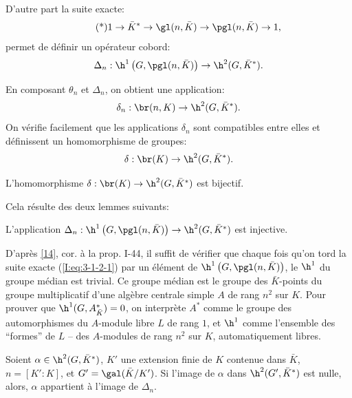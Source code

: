 D'autre part la suite exacte:
\begin{equation*}\tag{*}\label{I:eq:3-1-2-1}
  1 \to \bar K^* \to \gl(n,\bar K) \to \pgl(n,\bar K) \to 1\text{,}
\end{equation*}
permet de définir un opérateur cobord:
\[
  \Delta_n : \h^1\left(G,\pgl(n,\bar K)\right) \to \h^2(G,\bar K^*)\text{.}
\]

En composant $\theta_n$ et $\Delta_n$, on obtient une application:
\[
  \delta_n : \br(n,K) \to \h^2(G,\bar K^*)\text{.}
\]
On vérifie facilement que les applications $\delta_n$ sont compatibles entre 
elles et définissent un homomorphisme de groupes:
\[
  \delta : \br(K) \to \h^2(G,\bar K^*)\text{.}
\]





\begin{propositiondotdash}\label{I:3-1-3}
L'homomorphisme $\delta:\br(K)\to \h^2(G,\bar K^*)$ est bijectif. 
\end{propositiondotdash}

Cela résulte des deux lemmes suivants:





\begin{lemmadotdash}\label{I:3-1-4}
L'application 
$\Delta_n:\h^1\left(G,\pgl(n,\bar K)\right)\to \h^2(G,\bar K^*)$ est 
injective.
\end{lemmadotdash}

D'après \hyperlink{cite.se94}{[14]}, cor. à la prop. I-44, il suffit de vérifier que chaque 
fois qu'on tord la suite exacte (\ref{I:eq:3-1-2-1}) par un élément de 
$\h^1\left(G,\pgl(n,\bar K)\right)$, le $\h^1$ du groupe médian est trivial. 
Ce groupe médian est le groupe des $\bar K$-points du groupe multiplicatif 
d'une algèbre centrale simple $A$ de rang $n^2$ sur $K$. Pour prouver que 
$\h^1(G,A_{\bar K}^*) = 0$, on interprète $A^*$ comme le groupe 
des automorphismes du $A$-module libre $L$ de rang $1$, et $\h^1$ comme 
l'ensemble des ``formes'' de $L$ -- des $A$-modules de rang $n^2$ sur $K$, 
automatiquement libres. 





\begin{lemmadotdash}\label{I:3-1-5}
Soient $\alpha\in \h^2(G,\bar K^*)$, $K'$ une extension finie de $K$ 
contenue dans $\bar K$, $n=[K':K]$, et $G'=\gal(\bar K/K')$. Si l'image de 
$\alpha$ dans $\h^2(G',\bar K^*)$ est nulle, alors, $\alpha$ appartient 
à l'image de $\Delta_n$. 
\end{lemmadotdash}

